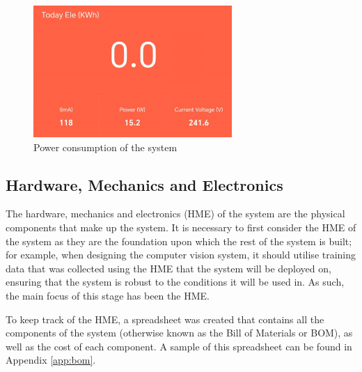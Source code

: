 \begin{figure}[t]
\begin{minipage}[t]{0.22\textwidth}
      \centering
      \includegraphics[width=\textwidth,height=5cm, keepaspectratio]{imgs/parts/powermeter.png}
      \caption{Power consumption of the system}
      \label{fig:powermeter}
  \end{minipage}
\end{figure}

\subsection{Hardware, Mechanics and Electronics}
The hardware, mechanics and electronics (HME) of the system are the physical components that make up the system.
It is necessary to first consider the HME of the system as they are the foundation upon which the rest of the system is built;
for example, when designing the computer vision system, it should utilise training data that was collected using the HME 
that the system will be deployed on, ensuring that the system is robust to the conditions it will be used in. As such,
the main focus of this stage has been the HME.

To keep track of the HME, a spreadsheet was created that contains all the components of the system (otherwise known as the Bill of Materials or BOM),
as well as the cost of each component. A sample of this spreadsheet can be found in Appendix \ref*{app:bom}.
